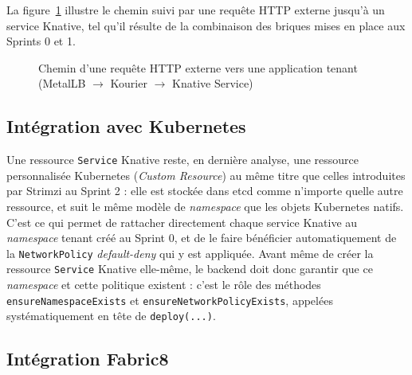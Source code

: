 La figure~\ref{fig:sprint1-flux} illustre le chemin suivi par une requête HTTP externe jusqu'à un service Knative, tel qu'il résulte de la combinaison des briques mises en place aux Sprints 0 et 1.

\begin{figure}[H]
\centering
{}
\caption{Chemin d'une requête HTTP externe vers une application tenant (MetalLB $\rightarrow$ Kourier $\rightarrow$ Knative Service)}
\label{fig:sprint1-flux}
\end{figure}

\subsection{Intégration avec Kubernetes}

Une ressource \texttt{Service} Knative reste, en dernière analyse, une ressource personnalisée Kubernetes (\textit{Custom Resource}) au même titre que celles introduites par Strimzi au Sprint 2 : elle est stockée dans etcd comme n'importe quelle autre ressource, et suit le même modèle de \textit{namespace} que les objets Kubernetes natifs. C'est ce qui permet de rattacher directement chaque service Knative au \textit{namespace} tenant créé au Sprint 0, et de le faire bénéficier automatiquement de la \texttt{NetworkPolicy} \textit{default-deny} qui y est appliquée. Avant même de créer la ressource \texttt{Service} Knative elle-même, le backend doit donc garantir que ce \textit{namespace} et cette politique existent : c'est le rôle des méthodes \texttt{ensureNamespaceExists} et \texttt{ensureNetworkPolicyExists}, appelées systématiquement en tête de \texttt{deploy(...)}.

\subsection{Intégration Fabric8}

